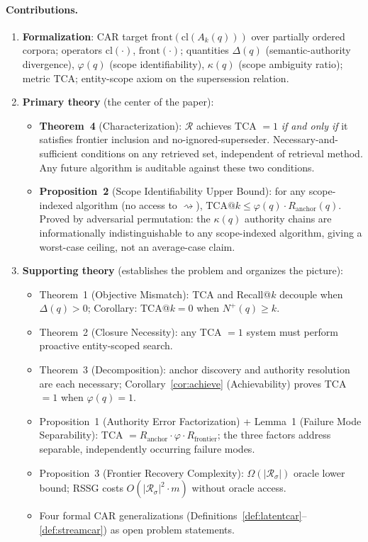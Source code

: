 \documentclass[11pt]{article}
\begin{document}
\paragraph{Contributions.}
\begin{enumerate}
  \item \textbf{Formalization}: CAR target $\mathrm{front}(\mathrm{cl}(A_k(q)))$ over partially ordered corpora; operators $\mathrm{cl}(\cdot)$, $\mathrm{front}(\cdot)$; quantities $\Delta(q)$ (semantic-authority divergence), $\varphi(q)$ (scope identifiability), $\kappa(q)$ (scope ambiguity ratio); metric TCA; entity-scope axiom on the supersession relation.

  \item \textbf{Primary theory} (the center of the paper):
  \begin{itemize}[noitemsep]
    \item \textbf{Theorem~4} (Characterization): $\mathcal{R}$ achieves TCA $= 1$ \emph{if and only if} it satisfies frontier inclusion and no-ignored-superseder. Necessary-and-sufficient conditions on any retrieved set, independent of retrieval method. Any future algorithm is auditable against these two conditions.
    \item \textbf{Proposition~2} (Scope Identifiability Upper Bound): for any scope-indexed algorithm (no access to $\rightsquigarrow$), $\mathrm{TCA}@k \leq \varphi(q) \cdot R_{\mathrm{anchor}}(q)$. Proved by adversarial permutation: the $\kappa(q)$ authority chains are informationally indistinguishable to any scope-indexed algorithm, giving a worst-case ceiling, not an average-case claim.
  \end{itemize}

  \item \textbf{Supporting theory} (establishes the problem and organizes the picture):
  \begin{itemize}[noitemsep]
    \item Theorem~1 (Objective Mismatch): TCA and Recall@$k$ decouple when $\Delta(q) > 0$; Corollary: TCA@$k = 0$ when $N^+(q) \geq k$.
    \item Theorem~2 (Closure Necessity): any TCA $= 1$ system must perform proactive entity-scoped search.
    \item Theorem~3 (Decomposition): anchor discovery and authority resolution are each necessary; Corollary~\ref{cor:achieve} (Achievability) proves TCA $= 1$ when $\varphi(q) = 1$.
    \item Proposition~1 (Authority Error Factorization) + Lemma~1 (Failure Mode Separability): TCA $= R_{\mathrm{anchor}} \cdot \varphi \cdot R_{\mathrm{frontier}}$; the three factors address separable, independently occurring failure modes.
    \item Proposition~3 (Frontier Recovery Complexity): $\Omega(|\mathcal{R}_\sigma|)$ oracle lower bound; RSSG costs $O(|\mathcal{R}_\sigma|^2 \cdot m)$ without oracle access.
    \item Four formal CAR generalizations (Definitions~\ref{def:latentcar}--\ref{def:streamcar}) as open problem statements.
  \end{itemize}


\end{enumerate}
\end{document}
